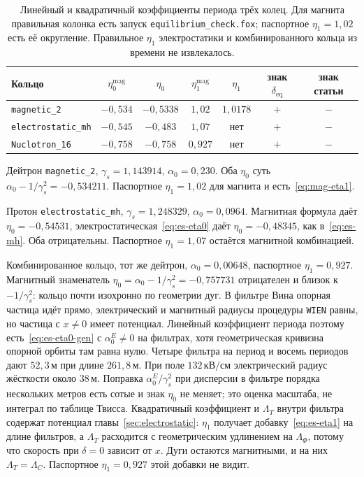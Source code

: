 \begin{table}[t]
\centering
\caption{Линейный и квадратичный коэффициенты периода трёх колец. Для магнита правильная колонка есть запуск \texttt{equilibrium\_check.fox}; паспортное $\eta_1=1{,}02$ есть её округление. Правильное $\eta_1$ электростатики и комбинированного кольца из времени не извлекалось.}
\label{tab:map-rings}
\begin{tabular}{lcccccc}
\hline
Кольцо & $\eta_0^{\mathrm{mag}}$ & $\eta_0$ & $\eta_1^{\mathrm{mag}}$ & $\eta_1$ & знак $\delta_{\mathrm{eq}}$ & знак статьи \\
\hline
\texttt{magnetic\_2} & $-0{,}534$ & $-0{,}5338$ & $1{,}02$ & $1{,}0178$ & $+$ & $-$ \\
\texttt{electrostatic\_mh} & $-0{,}545$ & $-0{,}483$ & $1{,}07$ & нет & $+$ & $-$ \\
\texttt{Nuclotron\_16} & $-0{,}758$ & $-0{,}758$ & $0{,}927$ & нет & $+$ & $-$ \\
\hline
\end{tabular}
\end{table}

Дейтрон \texttt{magnetic\_2}, $\gamma_s=1{,}143914$, $\alpha_0=0{,}230$. Оба $\eta_0$ суть $\alpha_0-1/\gamma_s^2=-0{,}534211$. Паспортное $\eta_1=1{,}02$ для магнита и есть~\eqref{eq:mag-eta1}.

Протон \texttt{electrostatic\_mh}, $\gamma_s=1{,}248329$, $\alpha_0=0{,}0964$. Магнитная формула даёт $\eta_0=-0{,}54531$, электростатическая~\eqref{eq:es-eta0} даёт $\eta_0=-0{,}48345$, как в~\eqref{eq:es-mh}. Оба отрицательны. Паспортное $\eta_1=1{,}07$ остаётся магнитной комбинацией.

Комбинированное кольцо, тот же дейтрон, $\alpha_0=0{,}00648$, паспортное $\eta_1=0{,}927$. Магнитный знаменатель $\eta_0=\alpha_0-1/\gamma_s^2=-0{,}757731$ отрицателен и близок к $-1/\gamma_s^2$: кольцо почти изохронно по геометрии дуг. В фильтре Вина опорная частица идёт прямо, электрический и магнитный радиусы процедуры \texttt{WIEN} равны, но частица с $x\neq 0$ имеет потенциал. Линейный коэффициент периода поэтому есть~\eqref{eq:es-eta0-gen} с $\alpha_0^{E}\neq 0$ на фильтрах, хотя геометрическая кривизна опорной орбиты там равна нулю. Четыре фильтра на период и восемь периодов дают $52{,}3\,\mathrm{м}$ при длине $261{,}8\,\mathrm{м}$. При поле $132\,\mathrm{кВ/см}$ электрический радиус жёсткости около $38\,\mathrm{м}$. Поправка $\alpha_0^{E}/\gamma_s^2$ при дисперсии в фильтре порядка нескольких метров есть сотые и знак $\eta_0$ не меняет; это оценка масштаба, не интеграл по таблице Твисса. Квадратичный коэффициент и $\Lambda_T$ внутри фильтра содержат потенциал главы~\ref{sec:electrostatic}: $\eta_1$ получает добавку~\eqref{eq:es-eta1} на длине фильтров, а $\Lambda_T$ расходится с геометрическим удлинением на $\Lambda_\Phi$, потому что скорость при $\delta=0$ зависит от $x$. Дуги остаются магнитными, и на них $\Lambda_T=\Lambda_C$. Паспортное $\eta_1=0{,}927$ этой добавки не видит.

